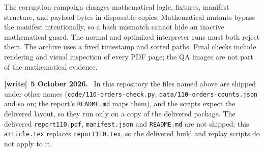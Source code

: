 \documentclass[11pt,a4paper]{article}
\numberwithin{equation}{section}
\theoremstyle{remark}
\newcommand{\file}[1]{\nolinkurl{#1}}
\newenvironment{writenote}[1][]{\par\smallskip\begingroup\small
 \noindent\textbf{[write]}\if\relax\detokenize{#1}\relax\else~\textbf{#1.}\fi\ }%
 {\par\endgroup\smallskip}
\begin{document}
The corruption campaign changes mathematical logic, fixtures, manifest structure, and payload bytes in disposable copies. Mathematical mutants bypass the manifest intentionally, so a hash mismatch cannot hide an inactive mathematical guard. The normal and optimized interpreter runs must both reject them. The archive uses a fixed timestamp and sorted paths. Final checks include rendering and visual inspection of every PDF page; the QA images are not part of the mathematical evidence.

\begin{writenote}[5 October 2026]
In this repository the files named above are shipped under other names (\file{code/110-orders-check.py}, \file{data/110-orders-counts.json} and so on; the report's \file{README.md} maps them), and the scripts expect the delivered layout, so they run only on a copy of the delivered package. The delivered \file{report110.pdf}, \file{manifest.json} and \file{README.md} are not shipped; this \file{article.tex} replaces \file{report110.tex}, so the delivered build and replay scripts do not apply to it.
\end{writenote}

\clearpage
\end{document}
